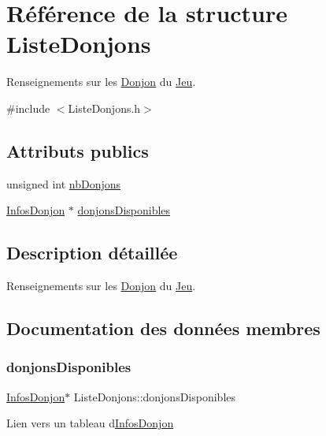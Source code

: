 \hypertarget{structListeDonjons}{}\section{Référence de la structure Liste\+Donjons}
\label{structListeDonjons}


Renseignements sur les \mbox{\hyperlink{classDonjon}{Donjon}} du \mbox{\hyperlink{classJeu}{Jeu}}.  




{\ttfamily \#include $<$Liste\+Donjons.\+h$>$}

\subsection*{Attributs publics}
\begin{DoxyCompactItemize}
\item 
unsigned int \mbox{\hyperlink{structListeDonjons_a2882a197744600dd1bf1ee424fc272d7}{nb\+Donjons}}
\item 
\mbox{\hyperlink{structInfosDonjon}{Infos\+Donjon}} $\ast$ \mbox{\hyperlink{structListeDonjons_a42f7dfbff78b6b0ea6ed9d4cad3e4c4b}{donjons\+Disponibles}}
\end{DoxyCompactItemize}


\subsection{Description détaillée}
Renseignements sur les \mbox{\hyperlink{classDonjon}{Donjon}} du \mbox{\hyperlink{classJeu}{Jeu}}. 

\subsection{Documentation des données membres}
\mbox{\label{structListeDonjons_a42f7dfbff78b6b0ea6ed9d4cad3e4c4b}} 
\subsubsection{\texorpdfstring{donjons\+Disponibles}{donjonsDisponibles}}
{\footnotesize\ttfamily \mbox{\hyperlink{structInfosDonjon}{Infos\+Donjon}}$\ast$ Liste\+Donjons\+::donjons\+Disponibles}

Lien vers un tableau d\textquotesingle{}\mbox{\hyperlink{structInfosDonjon}{Infos\+Donjon}} \mbox{\label{structListeDonjons_a2882a197744600dd1bf1ee424fc272d7}} 
